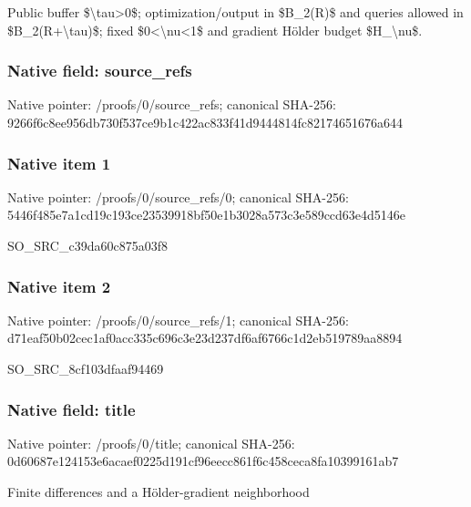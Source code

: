 \documentclass[10pt,a4paper]{article}
\begin{document}
\begingroup\raggedright\sloppy Public buffer \$\textbackslash{}tau>0\$;\allowbreak{} optimization/\allowbreak{}output in \$B\_\allowbreak{}2(R)\$ and queries allowed in \$B\_\allowbreak{}2(R+\textbackslash{}tau)\$;\allowbreak{} fixed \$0<\textbackslash{}nu<1\$ and gradient H{\AtlasUnicodeText ö}\allowbreak{}lder budget \$H\_\allowbreak{}\textbackslash{}nu\$.\par\endgroup

\subsubsection{Native field: source\_\allowbreak{}refs}
Native pointer: /proofs/0/source\_\allowbreak{}refs; canonical SHA-256: 9266f6c8ee956db730f537ce9b1c422ac833f41d9444814fc82174651676a644

\subsubsection{Native item 1}
Native pointer: /proofs/0/source\_\allowbreak{}refs/0; canonical SHA-256: 5446f485e7a1cd19c193ce23539918bf50e1b3028a573c3e589ccd63e4d5146e

\begingroup\raggedright\sloppy SO\_\allowbreak{}SRC\_\allowbreak{}c39da60c875a03f8\par\endgroup

\subsubsection{Native item 2}
Native pointer: /proofs/0/source\_\allowbreak{}refs/1; canonical SHA-256: d71eaf50b02cec1af0acc335c696c3e23d237df6af6766c1d2eb519789aa8894

\begingroup\raggedright\sloppy SO\_\allowbreak{}SRC\_\allowbreak{}8cf103dfaaf94469\par\endgroup

\subsubsection{Native field: title}
Native pointer: /proofs/0/title; canonical SHA-256: 0d60687e124153e6acaef0225d191cf96eecc861f6c458ceca8fa10399161ab7

\begingroup\raggedright\sloppy Finite differences and a H{\AtlasUnicodeText ö}\allowbreak{}lder-gradient neighborhood\par\endgroup
\end{document}
